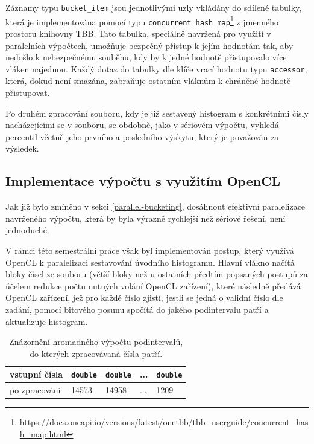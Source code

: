 \documentclass[12pt, a4paper]{article}
\begin{document}
Záznamy typu \texttt{bucket\_item} jsou jednotlivými uzly vkládány do sdílené tabulky, která je implementována pomocí typu \texttt{concurrent\_hash\_map}\footnote{\url{https://docs.oneapi.io/versions/latest/onetbb/tbb_userguide/concurrent_hash_map.html}} z jmenného prostoru knihovny TBB.
Tato tabulka, speciálně navržená pro využití v paralelních výpočtech, umožňuje bezpečný přístup k jejím hodnotám tak, aby nedošlo k nebezpečnému souběhu, kdy by k jedné hodnotě přistupovalo více vláken najednou.
Každý dotaz do tabulky dle klíče vrací hodnotu typu \texttt{accessor}, která, dokud není smazána, zabraňuje ostatním vláknům k chráněné hodnotě přistupovat.

Po druhém zpracování souboru, kdy je již sestavený histogram s konkrétními čísly nacházejícími se v souboru, se obdobně, jako v sériovém výpočtu, vyhledá percentil včetně jeho prvního a posledního výskytu, který je považován za výsledek.

\subsection{Implementace výpočtu s využitím OpenCL}
Jak již bylo zmíněno v sekci \ref{parallel-bucketing}, dosáhnout efektivní paralelizace navrženého výpočtu, která by byla výrazně rychlejší než sériové řešení, není jednoduché.

V rámci této semestrální práce však byl implementován postup, který využívá OpenCL k paralelizaci sestavování úvodního histogramu.
Hlavní vlákno načítá bloky čísel ze souboru (větší bloky než u ostatních předtím popsaných postupů za účelem redukce počtu nutných volání OpenCL zařízení),  které následně předává OpenCL zařízení, jež pro každé číslo zjistí, jestli se jedná o validní číslo dle zadání, pomocí bitového posunu spočítá do jakého podintervalu patří a aktualizuje histogram. 

\begin{table}[!ht]
    \begin{center}
        \begin{tabular}{ | m{6.5em} | m{1.5cm}| m{1.5cm} | m{1.5cm} | m{1.5cm} | } 
             \hline
             vstupní čísla & \texttt{double} & \texttt{double} & ... & \texttt{double} \\ 

             \hline
              po zpracování &  14573 & 14958 & ... & 1209 \\  

             \hline
        \end{tabular}
    \end{center}
    \caption{\label{tab:opencl-bucket-computation}Znázornění hromadného výpočtu podintervalů, do kterých zpracovávaná čísla patří.}
\end{table}
\end{document}

